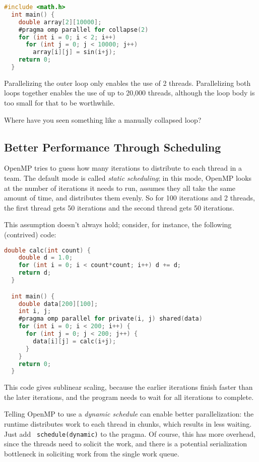\documentclass[11pt]{article}
\begin{document}
{\small
\begin{lstlisting}[language=C]
  #include <math.h>
  int main() {
    double array[2][10000];
    #pragma omp parallel for collapse(2)
    for (int i = 0; i < 2; i++)
      for (int j = 0; j < 10000; j++)
        array[i][j] = sin(i+j);
    return 0;
  }
\end{lstlisting}
}

Parallelizing the outer loop only enables the use of 2 threads.
Parallelizing both loops together enables the use of up to 20,000
threads, although the loop body is too small for that to be
worthwhile. 

{\sf Where have you seen something like a manually collapsed loop?}\\[1em]

\subsection*{Better Performance Through Scheduling}
OpenMP tries to guess how many iterations to distribute to each thread
in a team. The default mode is called \emph{static scheduling}; in
this mode, OpenMP looks at the number of iterations it needs to run,
assumes they all take the same amount of time, and distributes them
evenly. So for 100 iterations and 2 threads, the first thread gets 50
iterations and the second thread gets 50 iterations.

This assumption doesn't always hold; consider, for instance, the 
following (contrived) code:
{\small
\begin{lstlisting}[language=C]
  double calc(int count) {
    double d = 1.0;
    for (int i = 0; i < count*count; i++) d += d;
    return d;
  }

  int main() {
    double data[200][100];
    int i, j;
    #pragma omp parallel for private(i, j) shared(data)
    for (int i = 0; i < 200; i++) {
      for (int j = 0; j < 200; j++) {
        data[i][j] = calc(i+j);
      }
    }
    return 0;
  }
\end{lstlisting}
}
This code gives sublinear scaling, because the earlier iterations 
finish faster than the later iterations, and the program needs to wait
for all iterations to complete.

Telling OpenMP to use a \emph{dynamic schedule} can enable better
parallelization: the runtime distributes work to each thread in
chunks, which results in less waiting. Just add {\tt
  schedule(dynamic)} to the pragma. Of course, this has more overhead,
since the threads need to solicit the work, and there is a potential
serialization bottleneck in soliciting work from the single work
queue. 
\end{document}
